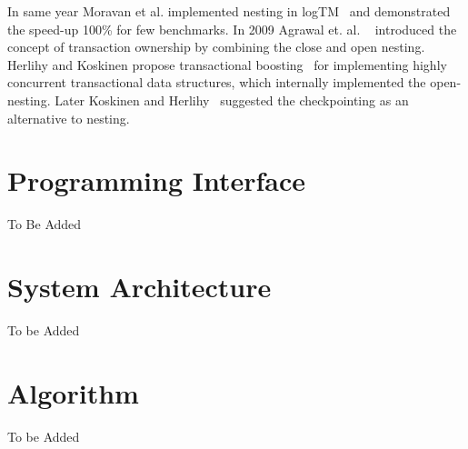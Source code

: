 \documentclass[12pt,english]{report}
\begin{document}
In same year Moravan et al. implemented nesting in logTM~\cite{moravan2006supporting} and demonstrated the speed-up 100\% for few benchmarks. In 2009 Agrawal et. al. ~\cite{agrawal2009safe} introduced the concept of transaction ownership by combining the close and open nesting. Herlihy and Koskinen propose transactional boosting~\cite{herlihy2008transactional} for implementing highly concurrent transactional data structures, which internally implemented the open-nesting. Later Koskinen and Herlihy~\cite{koskinen2008checkpoints} suggested the checkpointing as an alternative to nesting.

\chapter{Programming Interface}\label{chap:progInterface}

To Be Added



\chapter{System Architecture}\label{chap:sysArch}

To be Added

\chapter{Algorithm}\label{chap:algorithm}

To be Added

\end{document}
